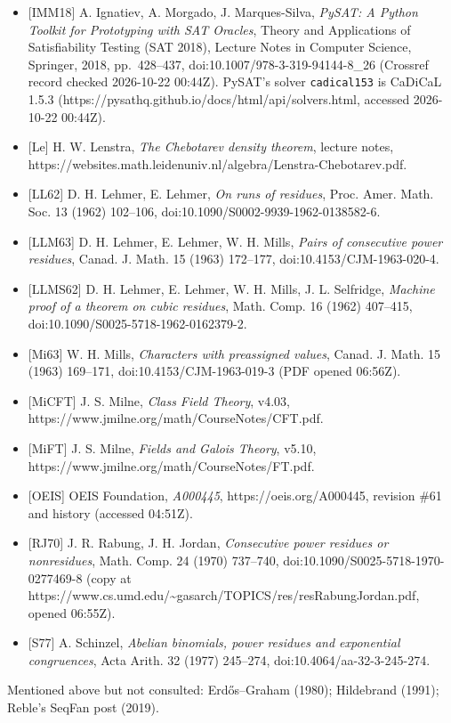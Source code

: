 \documentclass[
]{amsart}
\begin{document}
\begin{itemize}
  (not consulted).
\item
  {[}IMM18{]} A. Ignatiev, A. Morgado, J. Marques-Silva, \emph{PySAT: A
  Python Toolkit for Prototyping with SAT Oracles}, Theory and
  Applications of Satisfiability Testing (SAT 2018), Lecture Notes in
  Computer Science, Springer, 2018, pp.~428--437,
  doi:10.1007/978-3-319-94144-8\_26 (Crossref record checked 2026-10-22
  00:44Z). PySAT's solver \texttt{cadical153} is CaDiCaL 1.5.3
  (https://pysathq.github.io/docs/html/api/solvers.html, accessed
  2026-10-22 00:44Z).
\item
  {[}Le{]} H. W. Lenstra, \emph{The Chebotarev density theorem}, lecture
  notes,
  https://websites.math.leidenuniv.nl/algebra/Lenstra-Chebotarev.pdf.
\item
  {[}LL62{]} D. H. Lehmer, E. Lehmer, \emph{On runs of residues}, Proc.
  Amer. Math. Soc. 13 (1962) 102--106,
  doi:10.1090/S0002-9939-1962-0138582-6.
\item
  {[}LLM63{]} D. H. Lehmer, E. Lehmer, W. H. Mills, \emph{Pairs of
  consecutive power residues}, Canad. J. Math. 15 (1963) 172--177,
  doi:10.4153/CJM-1963-020-4.
\item
  {[}LLMS62{]} D. H. Lehmer, E. Lehmer, W. H. Mills, J. L. Selfridge,
  \emph{Machine proof of a theorem on cubic residues}, Math. Comp. 16
  (1962) 407--415, doi:10.1090/S0025-5718-1962-0162379-2.
\item
  {[}Mi63{]} W. H. Mills, \emph{Characters with preassigned values},
  Canad. J. Math. 15 (1963) 169--171, doi:10.4153/CJM-1963-019-3 (PDF
  opened 06:56Z).
\item
  {[}MiCFT{]} J. S. Milne, \emph{Class Field Theory}, v4.03,
  https://www.jmilne.org/math/CourseNotes/CFT.pdf.
\item
  {[}MiFT{]} J. S. Milne, \emph{Fields and Galois Theory}, v5.10,
  https://www.jmilne.org/math/CourseNotes/FT.pdf.
\item
  {[}OEIS{]} OEIS Foundation, \emph{A000445}, https://oeis.org/A000445,
  revision \#61 and history (accessed 04:51Z).
\item
  {[}RJ70{]} J. R. Rabung, J. H. Jordan, \emph{Consecutive power
  residues or nonresidues}, Math. Comp. 24 (1970) 737--740,
  doi:10.1090/S0025-5718-1970-0277469-8 (copy at
  https://www.cs.umd.edu/\textasciitilde gasarch/TOPICS/res/resRabungJordan.pdf,
  opened 06:55Z).
\item
  {[}S77{]} A. Schinzel, \emph{Abelian binomials, power residues and
  exponential congruences}, Acta Arith. 32 (1977) 245--274,
  doi:10.4064/aa-32-3-245-274.
\end{itemize}

Mentioned above but not consulted: Erdős--Graham (1980); Hildebrand
(1991); Reble's SeqFan post (2019).
\end{document}
